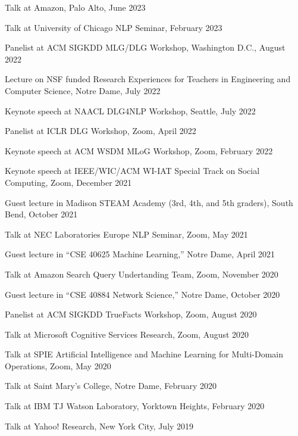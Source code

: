 \documentclass[10pt]{article}
\newenvironment{myindentpar}[1]%
{\begin{list}{}%
         {\setlength{\leftmargin}{#1}}%
         \item[]%
}
{\end{list}}
\newcounter{list}
\begin{document}
\begin{myindentpar}{0.75cm}
\hspace{-0.75cm} Talk at Amazon, Palo Alto, June 2023
	
\hspace{-0.75cm} Talk at University of Chicago NLP Seminar, February 2023
	
\hspace{-0.75cm} Panelist at ACM SIGKDD MLG/DLG Workshop, Washington D.C., August 2022
	
\hspace{-0.75cm} Lecture on NSF funded Research Experiences for Teachers in Engineering and Computer Science, Notre Dame, July 2022
	
\hspace{-0.75cm} Keynote speech at NAACL DLG4NLP Workshop, Seattle, July 2022
	
\hspace{-0.75cm} Panelist at ICLR DLG Workshop, Zoom, April 2022
	
\hspace{-0.75cm} Keynote speech at ACM WSDM MLoG Workshop, Zoom, February 2022
	
\hspace{-0.75cm} Keynote speech at IEEE/WIC/ACM WI-IAT Special Track on Social Computing, Zoom, December 2021
	
\hspace{-0.75cm} Guest lecture in Madison STEAM Academy (3rd, 4th, and 5th graders), South Bend, October 2021
	
\hspace{-0.75cm} Talk at NEC Laboratories Europe NLP Seminar, Zoom, May 2021
	
\hspace{-0.75cm} Guest lecture in ``CSE 40625 Machine Learning,'' Notre Dame, April 2021
	
\hspace{-0.75cm} Talk at Amazon Search Query Undertanding Team, Zoom, November 2020

\hspace{-0.75cm} Guest lecture in ``CSE 40884 Network Science,'' Notre Dame, October 2020

\hspace{-0.75cm} Panelist at ACM SIGKDD TrueFacts Workshop, Zoom, August 2020
	
\hspace{-0.75cm} Talk at Microsoft Cognitive Services Research, Zoom, August 2020
	
\hspace{-0.75cm} Talk at SPIE Artificial Intelligence and Machine Learning for Multi-Domain Operations, Zoom, May 2020
	
\hspace{-0.75cm} Talk at Saint Mary's College, Notre Dame, February 2020
	
\hspace{-0.75cm} Talk at IBM TJ Watson Laboratory, Yorktown Heights, February 2020
	
\hspace{-0.75cm} Talk at Yahoo! Research, New York City, July 2019

\end{myindentpar}
\end{document}
